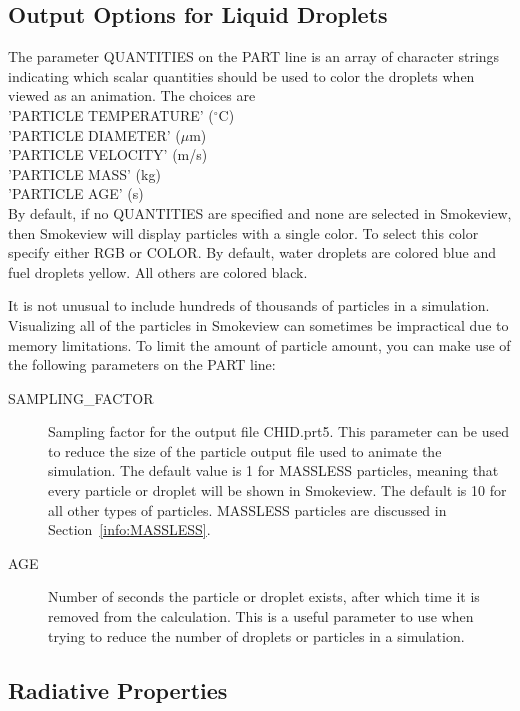 \documentclass[11pt]{book}
\begin{document}
\subsection{Output Options for Liquid Droplets}
\label{info:particle_quantities}

The parameter {\ct QUANTITIES} on the {\ct PART} line is an array of character strings indicating which scalar quantities should be used to color the droplets when viewed as an animation. The choices are \\
{\ct 'PARTICLE TEMPERATURE'} ($^\circ$C) \\
{\ct 'PARTICLE DIAMETER'} ($\mu$m) \\
{\ct 'PARTICLE VELOCITY'} (m/s) \\
{\ct 'PARTICLE MASS'} (kg) \\
{\ct 'PARTICLE AGE'} (s) \\
By default, if no {\ct QUANTITIES} are specified and none are selected in Smokeview, then Smokeview will display particles with a single color.  To select this color specify either {\ct RGB} or {\ct COLOR}. By default, water droplets are colored blue and fuel droplets yellow. All others are colored black.

It is not unusual to include hundreds of thousands of particles in a simulation. Visualizing all of the particles in Smokeview can sometimes be impractical due to memory limitations. To limit the amount of particle amount, you can make use of the following parameters on the {\ct PART} line:
\begin{description}
\item[{\ct SAMPLING\_FACTOR}] Sampling factor for the output file {\ct CHID.prt5}. This parameter can be used to reduce the size of the particle output file used to animate the simulation. The default value is 1 for {\ct MASSLESS} particles, meaning that every particle or droplet will be shown in Smokeview. The default is 10 for all other types of particles. {\ct MASSLESS} particles are discussed in Section~\ref{info:MASSLESS}.
\item[{\ct AGE}]  Number of seconds the particle or droplet exists, after which time it is removed from the calculation. This is a useful parameter to use when trying to reduce the number of droplets or particles in a simulation.
\end{description}



\subsection{Radiative Properties}
\label{radiative_part_props}
\end{document}
